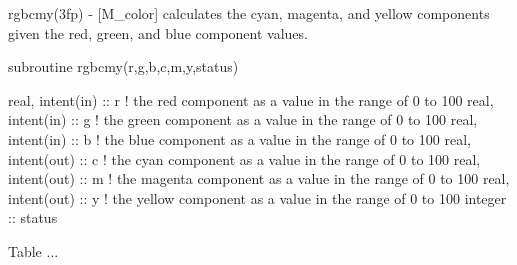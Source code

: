 \begin{DoxyDescription}
\item[\label{_RGBCMY}%
N\+A\+ME ]rgbcmy(3fp) -\/ \mbox{[}M\+\_\+color\mbox{]} calculates the cyan, magenta, and yellow components given the red, green, and blue component values. 


\item[S\+Y\+N\+O\+P\+S\+IS ]
\begin{DoxyPre}
    subroutine rgbcmy(r,g,b,c,m,y,status)\end{DoxyPre}



\begin{DoxyPre}     real, intent(in)  :: r ! the red component as a value in the range of 0 to 100
     real, intent(in)  :: g ! the green component as a value in the range of 0 to 100
     real, intent(in)  :: b ! the blue component as a value in the range of 0 to 100
     real, intent(out) :: c ! the cyan component as a value in the range of 0 to 100
     real, intent(out) :: m ! the magenta component as a value in the range of 0 to 100
     real, intent(out) :: y ! the yellow component as a value in the range of 0 to 100
     integer           :: status
    \end{DoxyPre}
 


\item[D\+E\+S\+C\+R\+I\+P\+T\+I\+ON ]Table ... ~\newline
~\newline


\begin{quote}
\tabulinesep=1mm
\end{quote}




\end{DoxyDescription}
